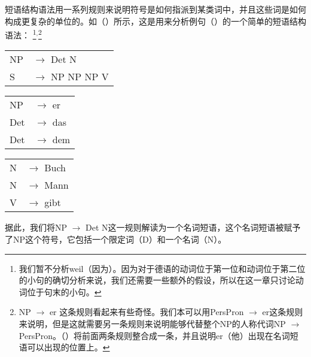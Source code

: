 短语结构语法用一系列规则来说明符号是如何指派到某类词中，并且这些词是如何构成更复杂的单位的。如（）所示，这是用来分析例句（）的一个简单的短语结构语法：
\footnote{%
我们暂不分析weil（因为）。因为对于德语的动词位于第一位和动词位于第二位的小句的确切分析来说，我们还需要一些额外的假设，所以在这一章只讨论动词位于句末的小句。
}$^,$\footnote{\label{fn-np-pron-ps-rule}%
NP $\to$ er 这条规则看起来有些奇怪。我们本可以用PersPron $\to$ er这条规则来说明，但是这就需要另一条规则来说明能够代替整个NP的人称代词NP $\to$ PersPron。（）将前面两条规则整合成一条，并且说明er（他）出现在名词短语可以出现的位置上。
}

\ea
\label{bsp-grammatik-psg}
\begin{tabular}[t]{@{}l@{ }l}
{NP} & {$\to$ Det N}\\          
{S}  & {$\to$ NP NP NP V}
\end{tabular}\hspace{2cm}%
\begin{tabular}[t]{@{}l@{ }l}
{NP} & {$\to$ er}\\
{Det}  & {$\to$ das}\\
{Det}  & {$\to$ dem}\\
\end{tabular}\hspace{8mm}
\begin{tabular}[t]{@{}l@{ }l}
{N} & {$\to$ Buch}\\
{N} & {$\to$ Mann}\\
{V} & {$\to$ gibt}\\
\end{tabular}
\z
据此，我们将NP $\to$\isc{$\to$}\is{$\to$} Det N这一规则解读为一个名词短语，这个名词短语被赋予了NP这个符号，它包括一个限定词（D）和一个名词（N）。

